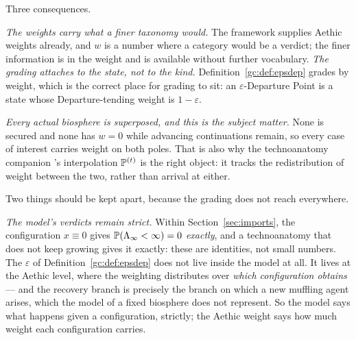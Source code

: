 \begin{remark}
\begin{remark}
Three consequences.

\emph{The weights carry what a finer taxonomy would.} The framework
supplies Aethic weights already, and $w$ is a number where a category
would be a verdict; the finer information is in the weight and is
available without further vocabulary. \emph{The grading attaches to the state, not to the kind.}
Definition~\ref{gc:def:epsdep} grades by weight, which is the correct
place for grading to sit: an $\varepsilon$-Departure Point is a state
whose Departure-tending weight is $1-\varepsilon$.

\emph{Every actual biosphere is superposed, and this is the subject
matter.} None is secured and none has $w=0$ while advancing
continuations remain, so every case of interest carries weight on both
poles. That is also why the technoanatomy companion \cite{GoldenTechnoanatomy}'s interpolation $\mathbb{P}^{(t)}$ is
the right object: it tracks the redistribution of weight between the
two, rather than arrival at either.
\end{remark}

\begin{remark}
\label{gc:rem:twolayers}
Two things should be kept apart, because the grading does not reach
everywhere.

\emph{The model's verdicts remain strict.} Within Section~\ref{sec:imports}, the
configuration $x\equiv0$ gives $\mathbb{P}(\Lambda_\infty<\infty)=0$
\emph{exactly}, and a technoanatomy that does not keep growing gives it
exactly: these are identities, not small numbers. The $\varepsilon$
of Definition~\ref{gc:def:epsdep} does not live inside the model at
all. It lives at the Aethic level, where the weighting distributes over
\emph{which configuration obtains} --- and the recovery branch is
precisely the branch on which a new muffling agent arises, which the
model of a fixed biosphere does not represent. So the model says what
happens given a configuration, strictly; the Aethic weight says how
much weight each configuration carries.


\end{remark}
\end{remark}
